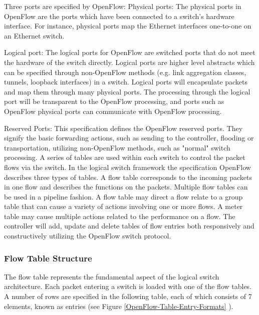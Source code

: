 \documentclass[
  oneside,
  11pt, a4paper,
  footinclude=true,
  headinclude=true,
  cleardoublepage=empty
]{scrbook}
\begin{document}
Three ports are specified by OpenFlow: Physical ports:
   The physical ports in OpenFlow are the ports which have been connected to a switch’s hardware interface. For instance, physical ports map the Ethernet interfaces one-to-one on an Ethernet switch.\par

   Logical port: The logical ports for OpenFlow are switched ports that do not meet the hardware of the switch directly. Logical ports are higher level abstracts which can be specified through non-OpenFlow methods (e.g. link aggregation classes, tunnels, loopback interfaces) in a switch. 
   Logical ports will encapsulate packets and map them through many physical ports. The processing through the logical port will be transparent to the OpenFlow processing, and ports such as OpenFlow physical ports can communicate with OpenFlow processing.
   
   Reserved Ports: This specification defines the OpenFlow reserved ports. They signify the  basic forwarding actions, such as sending to the controller, flooding or transportation, utilizing non-OpenFlow methods, such as "normal" switch processing. 
   A series of tables are used within each switch to control the packet flows via the switch. 
   In the logical switch framework the specification OpenFlow describes three types of tables. A flow table corresponds to the incoming packets in one flow and describes the functions on the packets. Multiple flow tables can be used in a pipeline fashion. A flow table may direct a flow relate to a group table that can cause a variety of actions involving one or more flows. A meter table may cause multiple actions related to the performance on a flow. The controller will add, update and delete tables of flow entries both responsively and constructively utilizing the OpenFlow switch protocol.\par

\subsubsection{Flow Table Structure}

The flow table represents the fundamental aspect of the logical switch architecture. Each packet entering a switch is loaded with one of the flow tables. A number of rows are specified in the following table, each of which consists of 7 elements, known as entries (see Figure \ref{OpenFlow-Table-Entry-Formats} ).
\end{document}
